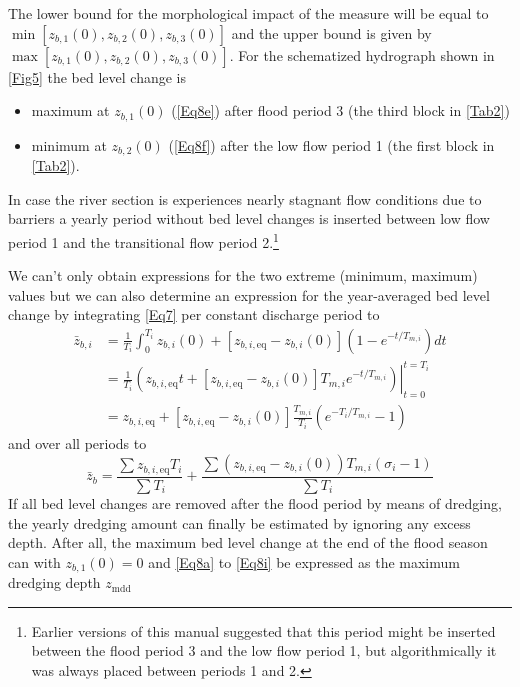 The lower bound for the morphological impact of the measure will be equal to $\min[z_{b,1}(0), z_{b,2}(0), z_{b,3}(0)]$ and the upper bound is given by $\max[z_{b,1}(0), z_{b,2}(0), z_{b,3}(0)]$.
For the schematized hydrograph shown in \autoref{Fig5} the bed level change is

\begin{itemize}
\item maximum at $z_{b,1}(0)$ (\autoref{Eq8e}) after flood period 3 (the third block in \autoref{Tab2})
\item minimum at $z_{b,2}(0)$ (\autoref{Eq8f}) after the low flow period 1 (the first block in \autoref{Tab2}).
\end{itemize}

In case the river section is experiences nearly stagnant flow conditions due to barriers a yearly period without bed level changes is inserted between low flow period 1 and the transitional flow period 2.\footnote{Earlier versions of this manual suggested that this period might be inserted between the flood period 3 and the low flow period 1, but algorithmically it was always placed between periods 1 and 2.}

We can't only obtain expressions for the two extreme (minimum, maximum) values but we can also determine an expression for the year-averaged bed level change by integrating \autoref{Eq7} per constant discharge period to
%
\begin{align}
\bar{z}_{b,i} &= \frac{1}{T_i} \int_0^{T_i}{z_{b,i} (0) + [z_{b,i,\text{eq}} - z_{b,i}(0)](1 - e^{-t/T_{m,i}})}dt \\
&= \frac{1}{T_i} \left . \left ( {z_{b,i,\text{eq}} t + [z_{b,i,\text{eq}} - z_{b,i}(0)]T_{m,i} e^{-t/T_{m,i}}} \right ) \right |_{t=0}^{t=T_i} \\
&= z_{b,i,\text{eq}} + [z_{b,i,\text{eq}} - z_{b,i}(0)] \frac{T_{m,i}}{T_i} ( e^{-T_i/T_{m,i}} - 1 )
\end{align}
%
and over all periods to
%
\begin{equation}
\bar{z}_b = \frac{\sum{z_{b,i,\text{eq}} T_i}}{\sum{T_i}} + \frac{\sum{(z_{b,i,\text{eq}}-z_{b,i}(0)) T_{m,i} (\sigma_i-1)}}{\sum{T_i}}
\label{Eq8h}
\end{equation}
%
If all bed level changes are removed after the flood period by means of dredging, the yearly dredging amount can finally be estimated by ignoring any excess depth.
After all, the maximum bed level change at the end of the flood season can with $z_{b,1}(0) = 0$ and \autoref{Eq8a} to \autoref{Eq8i} be expressed as the maximum dredging depth $z_\text{mdd}$

